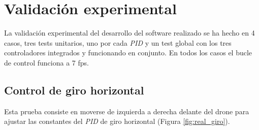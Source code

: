 \section{Validación experimental}
La validación experimental del desarrollo del software realizado se ha hecho en 4 casos, tres tests unitarios, uno por cada \textit{PID} y un test global con los tres controladores integrados y funcionando en conjunto. En todos los casos el bucle de control funciona a 7 \acrshort{fps}.

\subsection{Control de giro horizontal}
Esta prueba consiste en moverse de izquierda a derecha delante del drone para ajustar las constantes del \textit{PID} de giro horizontal (Figura \ref{fig:real_giro}).

